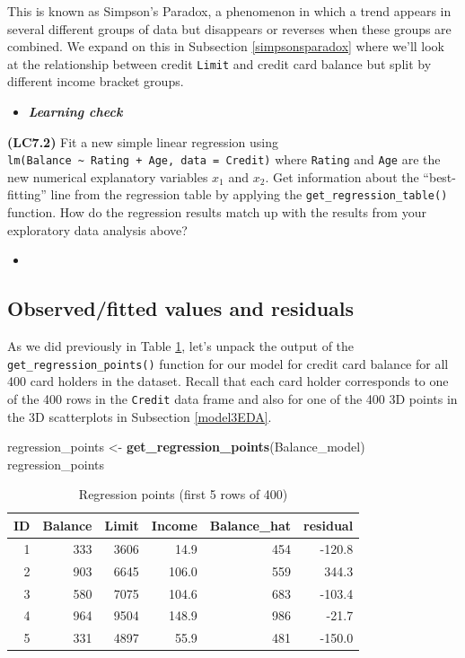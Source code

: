 \documentclass[12pt,]{krantz}
\makeatletter
\newenvironment{Shaded}{\begin{snugshade}}{\end{snugshade}}
\newcommand{\KeywordTok}[1]{\textcolor[rgb]{0.27,0.27,0.27}{\textbf{#1}}}
\newcommand{\StringTok}[1]{\textcolor[rgb]{0.5,0.5,0.5}{#1}}
\newcommand{\NormalTok}[1]{#1}
\newenvironment{kframe}{%
\medskip{}
\setlength{\fboxsep}{.8em}
 \def\at@end@of@kframe{}%
 \ifinner\ifhmode%
  \def\at@end@of@kframe{\end{minipage}}%
  \begin{minipage}{\columnwidth}%
 \fi\fi%
 \def\FrameCommand##1{\hskip\@totalleftmargin \hskip-\fboxsep
 \colorbox{shadecolor}{##1}\hskip-\fboxsep
     \hskip-\linewidth \hskip-\@totalleftmargin \hskip\columnwidth}%
 \MakeFramed {\advance\hsize-\width
   \@totalleftmargin\z@ \linewidth\hsize
   \@setminipage}}%
 {\par\unskip\endMakeFramed%
 \at@end@of@kframe}
\renewenvironment{Shaded}{\begin{kframe}}{\end{kframe}}
\newenvironment{rmdblock}[1]
  {\begin{shaded*}
  \begin{itemize}
  \renewcommand{\labelitemi}{
    \raisebox{-.7\height}[0pt][0pt]{
    }
  }
  \item
  }
  {
  \end{itemize}
  \end{shaded*}
  }
\newenvironment{learncheck}
  {\begin{rmdblock}{warning}}
  {\end{rmdblock}}
\theoremstyle{definition}
\theoremstyle{definition}
\theoremstyle{definition}
\theoremstyle{remark}
\makeatother
\begin{document}
This is known as Simpson's Paradox, a phenomenon in which a trend
appears in several different groups of data but disappears or reverses
when these groups are combined. We expand on this in Subsection
\ref{simpsonsparadox} where we'll look at the relationship between
credit \texttt{Limit} and credit card balance but split by different
income bracket groups.

\begin{learncheck}
\textbf{\emph{Learning check}}
\end{learncheck}

\textbf{(LC7.2)} Fit a new simple linear regression using
\texttt{lm(Balance\ \textasciitilde{}\ Rating\ +\ Age,\ data\ =\ Credit)}
where \texttt{Rating} and \texttt{Age} are the new numerical explanatory
variables \(x_1\) and \(x_2\). Get information about the
``best-fitting'' line from the regression table by applying the
\texttt{get\_regression\_table()} function. How do the regression
results match up with the results from your exploratory data analysis
above?

\begin{learncheck}

\end{learncheck}

\subsection{Observed/fitted values and residuals}\label{model3points}

As we did previously in Table \ref{tab:model3-points-table}, let's
unpack the output of the \texttt{get\_regression\_points()} function for
our model for credit card balance for all 400 card holders in the
dataset. Recall that each card holder corresponds to one of the 400 rows
in the \texttt{Credit} data frame and also for one of the 400 3D points
in the 3D scatterplots in Subsection \ref{model3EDA}.

\begin{Shaded}
\begin{Highlighting}[]
\NormalTok{regression_points <-}\StringTok{ }\KeywordTok{get_regression_points}\NormalTok{(Balance_model)}
\NormalTok{regression_points}
\end{Highlighting}
\end{Shaded}

\begin{table}[H]

\caption{\label{tab:model3-points-table}Regression points (first 5 rows of 400)}
\centering
\fontsize{10}{12}\selectfont
\begin{tabular}[t]{rrrrrr}
\toprule
ID & Balance & Limit & Income & Balance\_hat & residual\\
\midrule
1 & 333 & 3606 & 14.9 & 454 & -120.8\\
2 & 903 & 6645 & 106.0 & 559 & 344.3\\
3 & 580 & 7075 & 104.6 & 683 & -103.4\\
4 & 964 & 9504 & 148.9 & 986 & -21.7\\
5 & 331 & 4897 & 55.9 & 481 & -150.0\\
\bottomrule
\end{tabular}
\end{table}
\end{document}
